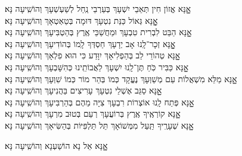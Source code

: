 \documentclass[twoside, openany, parskip=half, 11pt]{book}
\begin{document}
\begin{small}
אׇׇׇנָּא אֱזוֹן חִין תְּאֵבֵי יִשְׁעָךְ בְּעַרְבֵי נַֽחַל לְשַׁעְשְׁעָךְ \hfill וְהוֹשִֽׁיעָה נָּא׃\\
אׇׇׇׇׇנָּא גְּאוֹל כַּנַּת נִטְעָךְ דּוּמָה בְּטַאְטְאָךְ \hfill וְהוֹשִֽׁיעָה נָּא׃\\
אׇׇׇנָּא הַבֵּט לִבְרִית טִבְעָךְ וּמַחֲשַׁכֵּי אֶֽרֶץ בְּהַטְבִּיעָךְ \hfill וְהוֹשִֽׁיעָה נָּא׃\\
אׇׇׇׇׇנָּא זְכָר־לָֽנוּ אָב יְדָעָךְ חַסְדְּךָ לָֽמוֹ בְּהוֹדִיעָךְ \hfill וְהוֹשִֽׁיעָה נָּא׃\\
אׇׇׇנָּא טְהוֹרֵי לֵב בְּהַפְלִיאָךְ יִוָּדַע כִּי הוּא פִלְאָךְ \hfill וְהוֹשִֽׁיעָה נָּא׃\\
אׇׇׇנָּא כַּבִּיר כֹּֽחַ תֶּן־לָֽנוּ יִשְׁעָךְ לַאֲבוֹתֵֽינוּ כְּהִשָּׁבְעָךְ \hfill וְהוֹשִֽׁיעָה נָּא׃\\
אׇׇׇנָּא מַלֵּא מִשְׁאֲלוֹת עַם מְשַׁוְּעָךְ נֶעֱקָד כְּמוֹ בְּהַר מוֹר כְּמוֹ שִׁוְּעָךְ \hfill וְהוֹשִֽׁיעָה נָּא׃\\
אׇׇׇנָּא סַגֵּב אֶשְׁלֵי נִטְעָךְ עָרִיצִים בַּהֲנִיעָךְ \hfill וְהוֹשִֽׁיעָה נָּא׃\\
אׇׇׇנָּא פְּתַח לָֽנוּ אוֹצְרוֹת רִבְעָךְ צִיָּה מֵהֶם בְּהַרְבִּיעָךְ \hfill וְהוֹשִֽׁיעָה נָּא׃\\
אׇׇׇנָּא קוֹרְאֶֽיךָ אֶֽרֶץ בְּרוֹעֲעָךְ רְעֵם בְּטוּב מִרְעָךְ \hfill וְהוֹשִֽׁיעָה נָּא׃\\
אׇׇׇנָּא שְׁעָרֶֽיךָ תַּֽעַל מִמְּשׁוֹאָךְ תֵּל תַּלְפִּיּוֹת בְּהַשִּׂיאָךְ \hfill וְהוֹשִֽׁיעָה נָּא׃

\end{small}

\begin{large}
\shatzvkahal
אׇׇׇנָּא אֵל נָא הוֹשַׁעְנָא וְהוֹשִֽׁיעָה נָּא׃

\end{large}
\end{document}
